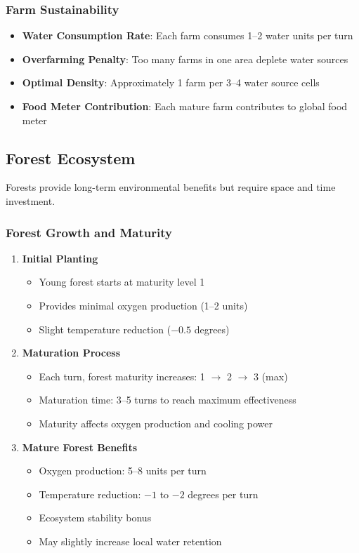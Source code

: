 \documentclass[12pt,a4paper]{article}
\begin{document}
\subsubsection{Farm Sustainability}

\begin{itemize}
    \item \textbf{Water Consumption Rate}: Each farm consumes 1--2 water units per turn
    \item \textbf{Overfarming Penalty}: Too many farms in one area deplete water sources
    \item \textbf{Optimal Density}: Approximately 1 farm per 3--4 water source cells
    \item \textbf{Food Meter Contribution}: Each mature farm contributes to global food meter
\end{itemize}

\subsection{Forest Ecosystem}

Forests provide long-term environmental benefits but require space and time investment.

\subsubsection{Forest Growth and Maturity}

\begin{enumerate}
    \item \textbf{Initial Planting}
    \begin{itemize}
        \item Young forest starts at maturity level 1
        \item Provides minimal oxygen production (1--2 units)
        \item Slight temperature reduction ($-0.5$ degrees)
    \end{itemize}
    
    \item \textbf{Maturation Process}
    \begin{itemize}
        \item Each turn, forest maturity increases: 1 $\rightarrow$ 2 $\rightarrow$ 3 (max)
        \item Maturation time: 3--5 turns to reach maximum effectiveness
        \item Maturity affects oxygen production and cooling power
    \end{itemize}
    
    \item \textbf{Mature Forest Benefits}
    \begin{itemize}
        \item Oxygen production: 5--8 units per turn
        \item Temperature reduction: $-1$ to $-2$ degrees per turn
        \item Ecosystem stability bonus
        \item May slightly increase local water retention
    \end{itemize}
\end{enumerate}
\end{document}
